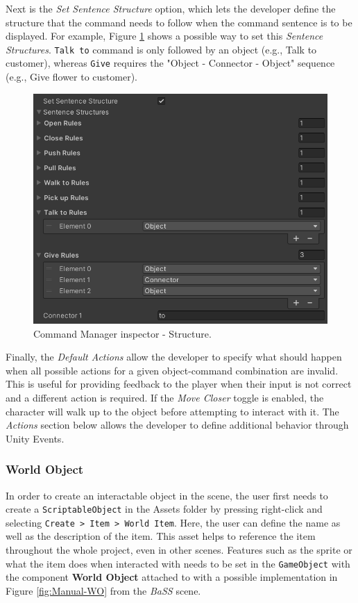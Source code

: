 Next is the \textit{Set Sentence Structure} option, which lets the developer define the structure that the command needs to follow when the command sentence is to be displayed. For example, Figure \ref{fig:Manual-CM3} shows a possible way to set this \textit{Sentence Structures}. \verb|Talk to| command is only followed by an object (e.g., Talk to customer), whereas \verb|Give| requires the "Object - Connector - Object" sequence (e.g., Give flower to customer).

\begin{figure}[H]
\centering
\includegraphics[width=.8\linewidth]{img/User doc/image_2025-07-04_203654317.png}
\caption{Command Manager inspector - Structure.}
\label{fig:Manual-CM3}
\end{figure}

Finally, the \textit{Default Actions} allow the developer to specify what should happen when all possible actions for a given object-command combination are invalid. This is useful for providing feedback to the player when their input is not correct and a different action is required. If the \textit{Move Closer} toggle is enabled, the character will walk up to the object before attempting to interact with it. The \textit{Actions} section below allows the developer to define additional behavior through Unity Events.

\subsubsection{World Object}
In order to create an interactable object in the scene, the user first needs to create a \verb|ScriptableObject| in the Assets folder by pressing right-click and selecting \verb|Create > Item > World Item|. Here, the user can define the name as well as the description of the item. This asset helps to reference the item throughout the whole project, even in other scenes. Features such as the sprite or what the item does when interacted with needs to be set in the \verb|GameObject| with the component \textbf{World Object} attached to with a possible implementation in Figure \ref{fig:Manual-WO} from the \textit{BaSS} scene. 

